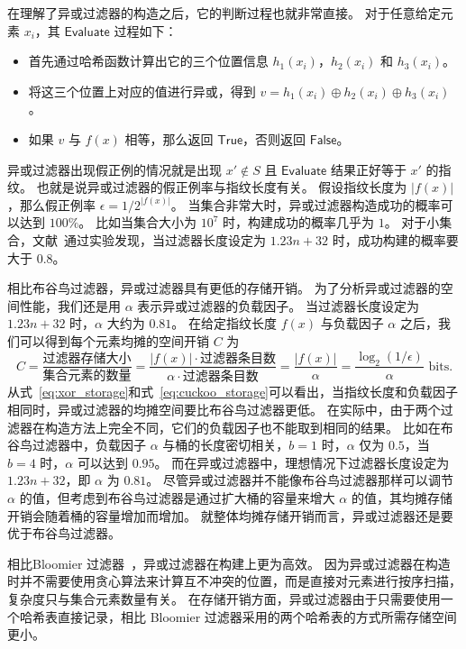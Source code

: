 在理解了异或过滤器的构造之后，它的判断过程也就非常直接。
对于任意给定元素 $x_i$，其 $\mathsf{Evaluate}$ 过程如下：
\begin{itemize}
  \item 首先通过哈希函数计算出它的三个位置信息 $h_1(x_i)$，$h_2(x_i)$ 和 $h_3(x_i)$。
  \item 将这三个位置上对应的值进行异或，得到 $v = h_1(x_i) \oplus h_2(x_i) \oplus h_3(x_i)$。
  \item 如果 $v$ 与 $f(x)$ 相等，那么返回 $\mathsf{True}$，否则返回 $\mathsf{False}$。
\end{itemize}

异或过滤器出现假正例的情况就是出现 $x'\notin S$ 且 $\mathsf{Evaluate}$ 结果正好等于 $x'$ 的指纹。
也就是说异或过滤器的假正例率与指纹长度有关。
假设指纹长度为 $|f(x)|$，那么假正例率 $\epsilon = 1 / 2^{|f(x)|}$。
当集合非常大时，异或过滤器构造成功的概率可以达到 $100\%$。
比如当集合大小为 $10^7$ 时，构建成功的概率几乎为 $1$。
对于小集合，文献~\cite{graf2020xor}通过实验发现，当过滤器长度设定为 $1.23 n + 32$ 时，成功构建的概率要大于 $0.8$。

相比布谷鸟过滤器，异或过滤器具有更低的存储开销。
为了分析异或过滤器的空间性能，我们还是用 $\alpha$ 表示异或过滤器的负载因子。
当过滤器长度设定为 $1.23n + 32$ 时，$\alpha$ 大约为 $0.81$。
在给定指纹长度 $f(x)$ 与负载因子 $\alpha$ 之后，我们可以得到每个元素均摊的空间开销 $C$ 为
\begin{equation}
  C = \frac{\mbox{过滤器存储大小}}{\mbox{集合元素的数量}} = \frac{|f(x)| \cdot \mbox{过滤器条目数}}{\alpha \cdot \mbox{过滤器条目数}} = \frac{|f(x)|}{\alpha} = \frac{\log_2(1/\epsilon)}{\alpha} \mbox{ bits}.
  \label{eq:xor_storage}
\end{equation}
从式~\ref{eq:xor_storage}和式~\ref{eq:cuckoo_storage}可以看出，当指纹长度和负载因子相同时，异或过滤器的均摊空间要比布谷鸟过滤器更低。
在实际中，由于两个过滤器在构造方法上完全不同，它们的负载因子也不能取到相同的结果。
比如在布谷鸟过滤器中，负载因子 $\alpha$ 与桶的长度密切相关，$b=1$ 时，$\alpha$ 仅为 $0.5$，当 $b=4$ 时，$\alpha$ 可以达到 $0.95$。
而在异或过滤器中，理想情况下过滤器长度设定为 $1.23n + 32$，即 $\alpha$ 为 $0.81$。
尽管异或过滤器并不能像布谷鸟过滤器那样可以调节 $\alpha$ 的值，但考虑到布谷鸟过滤器是通过扩大桶的容量来增大 $\alpha$ 的值，其均摊存储开销会随着桶的容量增加而增加。
就整体均摊存储开销而言，异或过滤器还是要优于布谷鸟过滤器。

相比Bloomier 过滤器~\cite{chazelle2004bloomier}，异或过滤器在构建上更为高效。
因为异或过滤器在构造时并不需要使用贪心算法来计算互不冲突的位置，而是直接对元素进行按序扫描，复杂度只与集合元素数量有关。
在存储开销方面，异或过滤器由于只需要使用一个哈希表直接记录，相比 Bloomier 过滤器采用的两个哈希表的方式所需存储空间更小。

